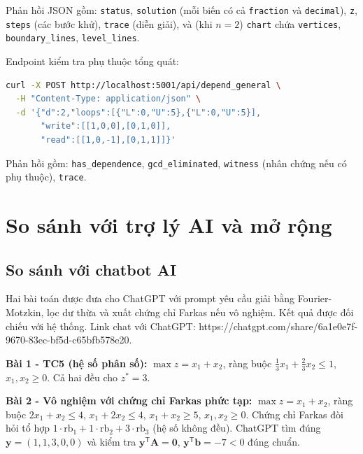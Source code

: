 \documentclass[12pt,a4paper]{article}
\theoremstyle{definition}
\newcommand{\vb}{\mathbf{b}}
\newcommand{\vy}{\mathbf{y}}
\newcommand{\mA}{\mathbf{A}}
\newcommand{\T}{^{\mathsf T}}
\begin{document}
Phản hồi JSON gồm: \texttt{status}, \texttt{solution} (mỗi biến có cả
\texttt{fraction} và \texttt{decimal}), \texttt{z}, \texttt{steps} (các bước
khử), \texttt{trace} (diễn giải), và (khi $n = 2$) \texttt{chart} chứa
\texttt{vertices}, \texttt{boundary\_lines}, \texttt{level\_lines}.

Endpoint kiểm tra phụ thuộc tổng quát:
\begin{lstlisting}[language=bash, caption={Gọi POST /api/depend\_general}]
curl -X POST http://localhost:5001/api/depend_general \
  -H "Content-Type: application/json" \
  -d '{"d":2,"loops":[{"L":0,"U":5},{"L":0,"U":5}],
       "write":[[1,0,0],[0,1,0]],
       "read":[[1,0,-1],[0,1,1]]}'
\end{lstlisting}

Phản hồi gồm: \texttt{has\_dependence}, \texttt{gcd\_eliminated},
\texttt{witness} (nhân chứng nếu có phụ thuộc), \texttt{trace}.

\section{So sánh với trợ lý AI và mở rộng}

\subsection{So sánh với chatbot AI}

Hai bài toán được đưa cho ChatGPT với prompt yêu cầu giải bằng Fourier-Motzkin,
lọc dư thừa và xuất chứng chỉ Farkas nếu vô nghiệm. Kết quả được đối chiếu với
hệ thống. 
\newline Link chat với ChatGPT: https://chatgpt.com/share/6a1e0e7f-9670-83ec-bf5d-c65bfb578e20.
\newline 

\textbf{Bài 1 - TC5 (hệ số phân số):}
$\max z = x_1+x_2$, ràng buộc $\tfrac{1}{3}x_1+\tfrac{2}{3}x_2 \le 1$,
$x_1,x_2 \ge 0$. Cả hai đều cho $z^\ast = 3$.

\textbf{Bài 2 - Vô nghiệm với chứng chỉ Farkas phức tạp:}
$\max z = x_1+x_2$, ràng buộc $2x_1+x_2 \le 4$, $x_1+2x_2 \le 4$,
$x_1+x_2 \ge 5$, $x_1,x_2 \ge 0$. Chứng chỉ Farkas đòi hỏi tổ hợp
$1\cdot\text{rb}_1 + 1\cdot\text{rb}_2 + 3\cdot\text{rb}_3$ (hệ số không đều).
ChatGPT tìm đúng $\vy = (1,1,3,0,0)$ và kiểm tra $\vy\T\mA = \mathbf{0}$,
$\vy\T\vb = -7 < 0$ đúng chuẩn.
\end{document}
